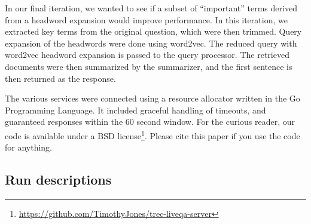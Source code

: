 \documentclass[a4paper,10pt,conference,compsocconf,final]{IEEEtran}
\newcommand\method[1]{{\sf\small{#1}}}
\begin{document}
In our final iteration, we wanted to see if a subset of ``important''
terms derived from a headword expansion would improve performance.
In this iteration, we extracted key terms from the original question,
which were then trimmed.
Query expansion of the headwords were done using {\method{word2vec}}.
The reduced query with {\method{word2vec}} headword expansion is
passed to the query processor.
The retrieved documents were then summarized by the summarizer, and
the first sentence is then returned as the response.

The various services were connected using a resource allocator
written in the Go Programming Language.
It included graceful handling of timeouts, and guaranteed responses
within the 60 second window.
For the curious reader, our code is available under a BSD
license\footnote{\url{https://github.com/TimothyJones/trec-liveqa-server}}.
Please cite this paper if you use the code for anything.

\subsection{Run descriptions}
\label{sec:runs}
\end{document}
